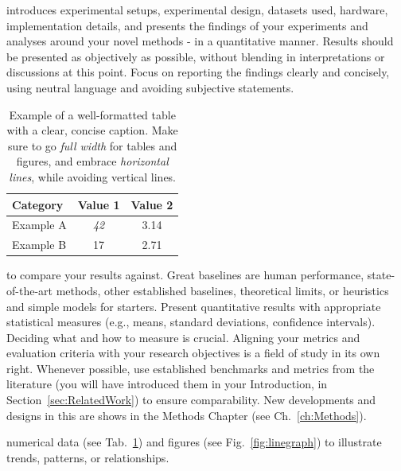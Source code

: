  introduces experimental setups, experimental design, datasets used, hardware, implementation details, 
and presents the findings of your experiments and analyses around your novel methods - in a quantitative manner. Results should be presented as objectively as possible, without blending in interpretations or discussions at this point. 
Focus on reporting the findings clearly and concisely, using neutral language and avoiding subjective statements.

\begin{table}[!ht]
  \centering
  \caption{Example of a well-formatted table with a clear, concise caption. Make sure to go \textit{full width} for tables and figures, and embrace \textit{horizontal lines}, while avoiding vertical lines.}
  \label{tab:example}
  \begin{tabular*}{\linewidth}{@{\extracolsep{\fill}}lcc}
    \toprule
    \textbf{Category} & \textbf{Value 1} & \textbf{Value 2} \\
    \midrule
    Example A & \textit{42} & 3.14 \\
    Example B & 17 & 2.71 \\
    \bottomrule
  \end{tabular*}
\end{table}

 

 to compare your results against. Great baselines are human performance, 
state-of-the-art methods, other established baselines, theoretical limits, or heuristics and simple models for starters. 
Present quantitative results with appropriate statistical measures (e.g., means, standard deviations, confidence intervals).
Deciding what and how to measure is crucial. Aligning your metrics and evaluation criteria with your research objectives is a field of study in its own right.
Whenever possible, use established benchmarks and metrics from the literature (you will have introduced them in your Introduction, in Section~\ref{sec:RelatedWork}) to ensure comparability. 
New developments and designs in this are shows in the Methods Chapter (see Ch.~\ref{ch:Methods}).

 numerical data (see Tab.~\ref{tab:example}) and figures (see Fig.~\ref{fig:linegraph}) to illustrate trends, patterns, or relationships.


